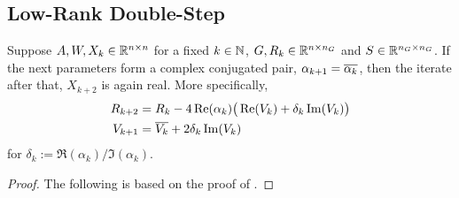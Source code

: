 \subsection{Low-Rank Double-Step}
\label{sec:adi:lr2step}

\begin{proposition}
\label{thm:adi:ale:complex-pair}
  Suppose $A, W, X_k\in\mathbb{R}^{n\times n}$ for a fixed $k\in\mathbb{N}$,
  \ie $G, R_k \in \mathbb{R}^{n\times n_G}$ and $S\in\mathbb{R}^{n_G\times n_G}$.
  If the next parameters form a complex conjugated pair,
  $\alpha_{k+1} = \conj{\alpha_k}$,
  then the iterate after that, $X_{k+2}$ is again real.
  More specifically,
  \begin{align*}
    R_{k+2} &= R_k - 4\Re(\alpha_k) \big(
      \Re(V_k) + \delta_k \Im(V_k)
    \big) \\
    V_{k+1} &= \conj{V_k} + 2\delta_k \Im(V_k)
  \end{align*}
  for $\delta_k := \Re(\alpha_k) / \Im(\alpha_k)$.
\end{proposition}
\begin{proof}
  The following is based on the proof of \cite[Theorem~4.2]{Kuerschner2016}.
\end{proof}

